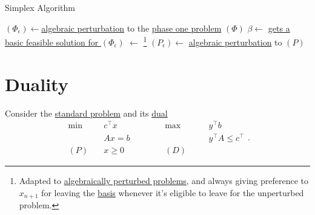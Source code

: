 \par
\begin{algorithm}[H]\label{algo:simplex-algorithm}
	\DontPrintSemicolon
	\caption{Simplex Algorithm}
	\BlankLine

	\((\Phi_{\epsilon})\gets\)\hyperref[def:perturbed-problem]{algebraic perturbation} to the \hyperref[def:phase-one-problem]{phase one problem} \((\Phi)\)\;
	\(\beta \gets \) \hyperref[prob:phase-one-problem]{gets a basic feasible solution for \((\Phi_{\epsilon })\)}\;
	\result \(\gets\) \WFSimplex{\((\Phi _\epsilon )\), \(\beta\)}\footnote{Adapted to \hyperref[def:perturbed-problem]{algebraically perturbed problems}, and always giving preference to \(x_{n+1}\) for leaving the \hyperref[def:basic]{basis} whenever it's eligible to leave for the unperturbed problem.}\;
	\;
	\((P_{\epsilon} )\gets\) \hyperref[def:perturbed-problem]{algebraic perturbation} to \((P)\)\;
\end{algorithm}

\chapter{Duality}
Consider the \hyperref[def:standard-form]{standard problem} and its \hyperref[def:dual]{dual}
\[
	\begin{alignedat}{5}
		\min~&c^{\top}x\qquad\qquad &&\max ~ &&y^{\top}b\\
		&Ax = b && &&y^{\top}A\leq c^{\top}\\
		(P)\quad&x\geq  0 &&(D)\quad&&
	\end{alignedat}.
\]
